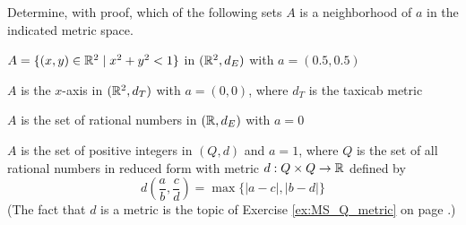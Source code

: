 \label{sec_open_balls_exer}

\be

\item Determine, with proof, which of the following sets $A$ is a neighborhood of $a$ in the indicated metric space. 

\ba

\item $A = \{(x,y) \in \mathbb{R}^2 \mid x^2+y^2 < 1\}$ in $(\mathbb{R}^2,d_E)$ with $a = (0.5,0.5)$

\item $A$ is the $x$-axis in $(\mathbb{R}^2,d_T)$ with $a =(0,0)$, where $d_T$ is the taxicab metric

\item $A$ is the set of rational numbers in $(\mathbb{R}, d_E)$ with $a = 0$

\item $A$ is the set of positive integers in $(Q,d)$ and $a = 1$, where $Q$ is the set of all rational numbers in reduced form with metric $d : Q \times Q \to \mathbb{R}$ defined by 
\[d\left(\frac{a}{b}, \frac{c}{d}\right) = \max\{| a-c |, | b-d |\}\]
(The fact that $d$ is a metric is the topic of Exercise \ref{ex:MS_Q_metric} on page \pageref{ex:MS_Q_metric}.)


\ea

\begin{comment}

\ExerciseSolution

\ba

\item Since $A = B((0,0),1)$ and we know that every open ball is a neighborhood of each of its points, we conclude that $A$ is a neighborhood of $a$. 

\item Let $\delta$ be a positive real number and consider the open ball $B(a, \delta)$ in $(\R^2,d_T)$. The point $\left(0, \frac{\delta}{2}\right)$ is in $B(a,\delta)$ but not in $A$. So $A$ cannot contain any open ball centered at $a$. We conclude that $A$ is not a neighborhood of $a$.  

\item Exercise \ref{ex:GLB_irrational} on page \pageref{ex:GLB_irrational} tells us that there is an irrational number between any two real numbers. So there are irrational numbers in any interval of the form $(a - \delta, a+\delta)$ for any $\delta > 0$. We conclude that $A$ is not a neighborhood of $a$. 

\item Consider the ball $B(a,1)$ in $Q$. An element $\frac{p}{q}$ is in $B(a,1)$ if 
\[d\left(\frac{1}{1}, \frac{p}{q}\right) = \max\{| 1-p |, | 1-q |\} < 1.\]
This can only happen if $|1-p| < 1$ and $|1-q| < 1$. But $p$ and $q$ are integers, so we must have $p = q = 1$. Thus, $B(a,1) = \{a\}$. So any set that contains $a$ in $Q$ contains $B(a,1)$. We conclude that any set that contains $a$ is a neighborhood of $a$.   

\ea

\end{comment}


